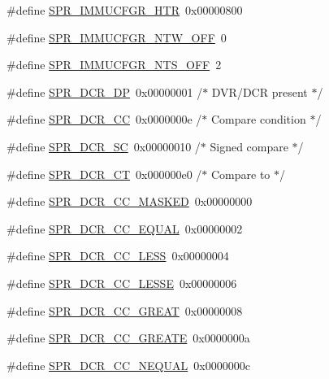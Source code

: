 \begin{DoxyCompactItemize}
\#define \hyperlink{spr-defs_8h_a1acf3d427b900d152d8866775d2444a8}{\-S\-P\-R\-\_\-\-I\-M\-M\-U\-C\-F\-G\-R\-\_\-\-H\-T\-R}~0x00000800
\item 
\#define \hyperlink{spr-defs_8h_a743acee56102f57694ba0b1bc7d2277b}{\-S\-P\-R\-\_\-\-I\-M\-M\-U\-C\-F\-G\-R\-\_\-\-N\-T\-W\-\_\-\-O\-F\-F}~0
\item 
\#define \hyperlink{spr-defs_8h_a0ff861e58606bf5b89bf277137753d3d}{\-S\-P\-R\-\_\-\-I\-M\-M\-U\-C\-F\-G\-R\-\_\-\-N\-T\-S\-\_\-\-O\-F\-F}~2
\item 
\#define \hyperlink{spr-defs_8h_a3fe3d3436b8ceb2a57ecb98d52c6445c}{\-S\-P\-R\-\_\-\-D\-C\-R\-\_\-\-D\-P}~0x00000001  /$\ast$ D\-V\-R/\-D\-C\-R present $\ast$/
\item 
\#define \hyperlink{spr-defs_8h_ae54a6c3be8b2a5cdff6c7cc249c8d48f}{\-S\-P\-R\-\_\-\-D\-C\-R\-\_\-\-C\-C}~0x0000000e  /$\ast$ Compare condition $\ast$/
\item 
\#define \hyperlink{spr-defs_8h_ae8b0b59ec0696db4241b9a9bff5ccab7}{\-S\-P\-R\-\_\-\-D\-C\-R\-\_\-\-S\-C}~0x00000010  /$\ast$ Signed compare $\ast$/
\item 
\#define \hyperlink{spr-defs_8h_a7198d61f81cb63b792414ec4339f7f87}{\-S\-P\-R\-\_\-\-D\-C\-R\-\_\-\-C\-T}~0x000000e0  /$\ast$ Compare to $\ast$/
\item 
\#define \hyperlink{spr-defs_8h_a019f602d6cc1b9fa94462357422e2849}{\-S\-P\-R\-\_\-\-D\-C\-R\-\_\-\-C\-C\-\_\-\-M\-A\-S\-K\-E\-D}~0x00000000
\item 
\#define \hyperlink{spr-defs_8h_aa0eb4b010c6ae45f7554e75f66549301}{\-S\-P\-R\-\_\-\-D\-C\-R\-\_\-\-C\-C\-\_\-\-E\-Q\-U\-A\-L}~0x00000002
\item 
\#define \hyperlink{spr-defs_8h_a9cc2282adb3955fe2cf5dc8d6005e97c}{\-S\-P\-R\-\_\-\-D\-C\-R\-\_\-\-C\-C\-\_\-\-L\-E\-S\-S}~0x00000004
\item 
\#define \hyperlink{spr-defs_8h_ad7fd5b2db291d510ebfa1823269a07e6}{\-S\-P\-R\-\_\-\-D\-C\-R\-\_\-\-C\-C\-\_\-\-L\-E\-S\-S\-E}~0x00000006
\item 
\#define \hyperlink{spr-defs_8h_ab8d9d0ab0e103a2c4725c18903f9cbbd}{\-S\-P\-R\-\_\-\-D\-C\-R\-\_\-\-C\-C\-\_\-\-G\-R\-E\-A\-T}~0x00000008
\item 
\#define \hyperlink{spr-defs_8h_aa748ba59c87855c1dbf814b3f7af7cfb}{\-S\-P\-R\-\_\-\-D\-C\-R\-\_\-\-C\-C\-\_\-\-G\-R\-E\-A\-T\-E}~0x0000000a
\item 
\#define \hyperlink{spr-defs_8h_aaa4018fd963c93bd4ff5c9c6cfbe17be}{\-S\-P\-R\-\_\-\-D\-C\-R\-\_\-\-C\-C\-\_\-\-N\-E\-Q\-U\-A\-L}~0x0000000c
\item 

\end{DoxyCompactItemize}

